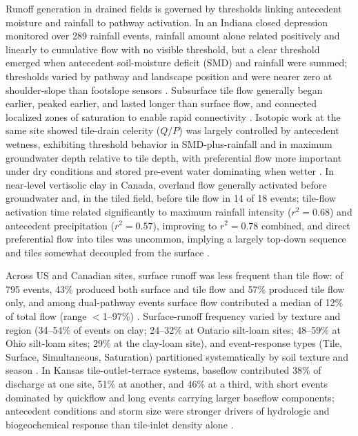 \documentclass[11pt]{article}
\begin{document}
Runoff generation in drained fields is governed by thresholds linking antecedent moisture and rainfall to pathway activation. In an Indiana closed depression monitored over 289 rainfall events, rainfall amount alone related positively and linearly to cumulative flow with no visible threshold, but a clear threshold emerged when antecedent soil-moisture deficit (SMD) and rainfall were summed; thresholds varied by pathway and landscape position and were nearer zero at shoulder-slope than footslope sensors \parencite{Williams2019}. Subsurface tile flow generally began earlier, peaked earlier, and lasted longer than surface flow, and connected localized zones of saturation to enable rapid connectivity \parencite{Williams2019}. Isotopic work at the same site showed tile-drain celerity ($Q/P$) was largely controlled by antecedent wetness, exhibiting threshold behavior in SMD-plus-rainfall and in maximum groundwater depth relative to tile depth, with preferential flow more important under dry conditions and stored pre-event water dominating when wetter \parencite{Williams2021}. In near-level vertisolic clay in Canada, overland flow generally activated before groundwater and, in the tiled field, before tile flow in 14 of 18 events; tile-flow activation time related significantly to maximum rainfall intensity ($r^2=0.68$) and antecedent precipitation ($r^2=0.57$), improving to $r^2=0.78$ combined, and direct preferential flow into tiles was uncommon, implying a largely top-down sequence and tiles somewhat decoupled from the surface \parencite{Kokulan2019}.

Across US and Canadian sites, surface runoff was less frequent than tile flow: of 795 events, 43\% produced both surface and tile flow and 57\% produced tile flow only, and among dual-pathway events surface flow contributed a median of 12\% of total flow (range $<$1--97\%) \parencite{Macrae2019}. Surface-runoff frequency varied by texture and region (34--54\% of events on clay; 24--32\% at Ontario silt-loam sites; 48--59\% at Ohio silt-loam sites; 29\% at the clay-loam site), and event-response types (Tile, Surface, Simultaneous, Saturation) partitioned systematically by soil texture and season \parencite{Macrae2019}. In Kansas tile-outlet-terrace systems, baseflow contributed 38\% of discharge at one site, 51\% at another, and 46\% at a third, with short events dominated by quickflow and long events carrying larger baseflow components; antecedent conditions and storm size were stronger drivers of hydrologic and biogeochemical response than tile-inlet density alone \parencite{Stops2022}.
\end{document}
